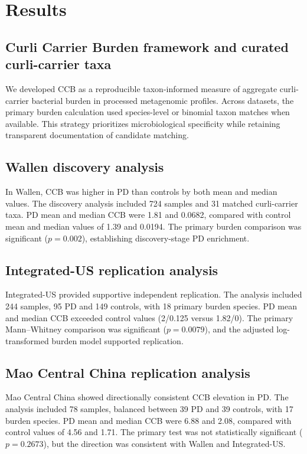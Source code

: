 \documentclass[12pt]{article}
\begin{document}
\section*{Results}
\subsection*{Curli Carrier Burden framework and curated curli-carrier taxa}
We developed CCB as a reproducible taxon-informed measure of aggregate curli-carrier bacterial burden in processed metagenomic profiles. Across datasets, the primary burden calculation used species-level or binomial taxon matches when available. This strategy prioritizes microbiological specificity while retaining transparent documentation of candidate matching.

\subsection*{Wallen discovery analysis}
In Wallen, CCB was higher in PD than controls by both mean and median values. The discovery analysis included 724 samples and 31 matched curli-carrier taxa. PD mean and median CCB were 1.81 and 0.0682, compared with control mean and median values of 1.39 and 0.0194. The primary burden comparison was significant ($p=0.002$), establishing discovery-stage PD enrichment.

\subsection*{Integrated-US replication analysis}
Integrated-US provided supportive independent replication. The analysis included 244 samples, 95 PD and 149 controls, with 18 primary burden species. PD mean and median CCB exceeded control values (2/0.125 versus 1.82/0). The primary Mann--Whitney comparison was significant ($p=0.0079$), and the adjusted log-transformed burden model supported replication.

\subsection*{Mao Central China replication analysis}
Mao Central China showed directionally consistent CCB elevation in PD. The analysis included 78 samples, balanced between 39 PD and 39 controls, with 17 burden species. PD mean and median CCB were 6.88 and 2.08, compared with control values of 4.56 and 1.71. The primary test was not statistically significant ($p=0.2673$), but the direction was consistent with Wallen and Integrated-US.
\end{document}
